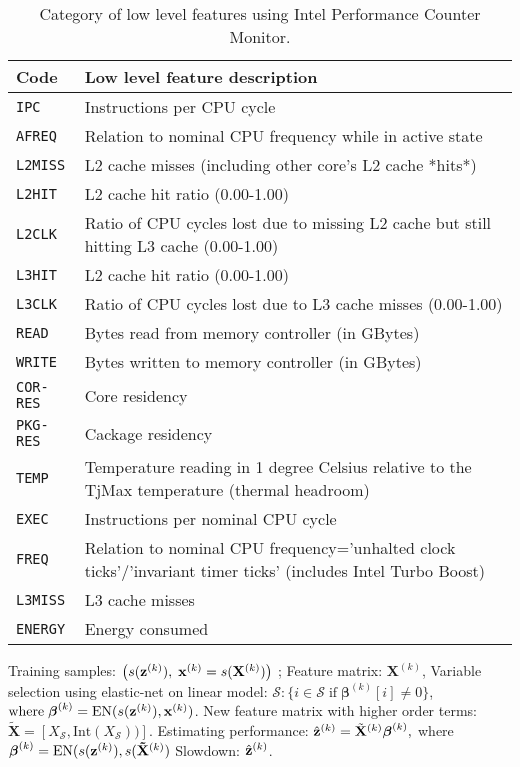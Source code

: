 \begin{table*}[htp!]
\centering
\footnotesize
\caption{Category of low level features using Intel Performance Counter Monitor. }
\begin{tabular}{ ll }
 \hline
 \hline
 \bf{Code} & \bf{Low level feature description} \\

 \hline
 \texttt{IPC}   & Instructions per CPU cycle    \\ 
 \texttt{AFREQ} & Relation to nominal CPU frequency while in active state    \\ 
 \texttt{L2MISS}& L2 cache misses (including other core's L2 cache *hits*)   \\ 
\texttt{L2HIT}  & L2 cache hit ratio (0.00-1.00)  \\ 
 \texttt{L2CLK} & Ratio of CPU cycles lost due to missing L2 cache but still hitting L3 cache (0.00-1.00)  \\ 
 \texttt{L3HIT} & L2 cache hit ratio (0.00-1.00)  \\ 
  \texttt{L3CLK}& Ratio of CPU cycles lost due to L3 cache misses (0.00-1.00)  \\ 
 \texttt{READ}  & Bytes read from memory controller (in GBytes) \\ 
 \texttt{WRITE} & Bytes written to memory controller (in GBytes)  \\ 
 \texttt{COR-RES}  &  Core residency  \\ 
\texttt{PKG-RES}  &  Cackage residency   \\ 
 \texttt{TEMP}  &  Temperature reading in 1 degree Celsius relative to the TjMax temperature (thermal headroom) \\ 
\texttt{EXEC}  &  Instructions per nominal CPU cycle \\ 
\texttt{FREQ}  &  Relation to nominal CPU frequency='unhalted clock ticks'/'invariant timer ticks' (includes Intel Turbo Boost) \\ 
\texttt{L3MISS}  &  L3 cache misses \\ 
\texttt{ENERGY}  &  Energy consumed  \\ 
 \hline
 \hline
\end{tabular}
\label{llf-table}
\end{table*}

\begin{algorithm}[!t]
\caption{\SYSTEM }
\begin{algorithmic}[1]
\REQUIRE  Training samples: $\left( s(\mathbf{z}^{(k)}), \; \mathbf{x}^{(k)} = s(\mathbf{X}^{(k)}) \right)$ ; Feature matrix: $\mathbf{X}^{(k)}$, 
	\STATE Variable selection using elastic-net on linear model:  $\mathcal{S}: \{ i \in \mathcal{S} \; \text{if} \; \boldsymbol{\beta}^{(k)}[i] \neq 0\}$, $ \text{where} \; \boldsymbol{\beta}^{(k)} = \text{EN}(s(\mathbf{z}^{(k)}), \mathbf{x}^{(k)})$.   
	\STATE New feature matrix with higher order terms:  $\tilde{\mathbf{X}} = [X_{\mathcal{S}},\text{Int}(X_{\mathcal{S}} ) )]$.   
	\STATE Estimating performance: $\hat{\mathbf{z}}^{(k)} = \tilde{\mathbf{X}}^{(k)}\boldsymbol{\beta}^{(k)}, $ where $\boldsymbol{\beta}^{(k)} = \text{EN}(s(\mathbf{z}^{(k)}), s(\mathbf{\tilde{X}}^{(k)})$
\RETURN Slowdown: $\hat{\mathbf{z}}^{(k)}$.
\end{algorithmic}
\label{alg:SYSTEM}
\end{algorithm}

